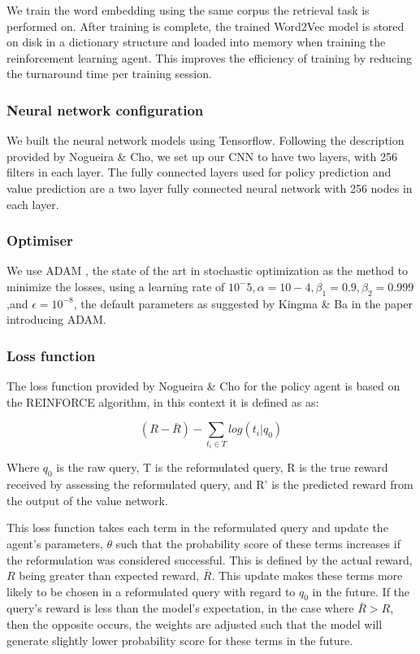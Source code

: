 We train the word embedding using the same corpus the retrieval task is performed on. After training is complete, the trained Word2Vec model is stored on disk in a dictionary structure and loaded into memory when training the reinforcement learning agent. This improves the efficiency of training by reducing the turnaround time per training session. 


\subsubsection{Neural network configuration}
We built the neural network models using Tensorflow. Following the description provided by Nogueira \& Cho\cite{nogueira2017task}, we set up our CNN to have two layers, with 256 filters in each layer. The fully connected layers used for policy prediction and value prediction are a two layer fully connected neural network with 256 nodes in each layer. 


\subsubsection{Optimiser}

We use ADAM \cite{kingma2014adam}, the state of the art in stochastic optimization as the method to minimize the losses, using a learning rate of $10^-5,\alpha=10−4,\beta_1 =0.9,\beta_2 =0.999$,and $\epsilon=10^{-8}$, the default parameters as suggested by Kingma \& Ba in the paper introducing ADAM.

\subsubsection{Loss function}

 The loss function provided by Nogueira \& Cho\cite{nogueira2017task} for the policy agent is based on the REINFORCE algorithm, in this context it is defined as as:

\begin{equation}
    (R - \bar{R}) - \sum_{t_i \in T} log (t_i|q_0) 
\end{equation}

Where $q_0$ is the raw query, T is the reformulated query, R is the true reward received by assessing the reformulated query, and R’ is the predicted reward from the output of the value network. 

This loss function takes each term in the reformulated query and update the agent's parameters, $\theta$ such that the probability score of these terms increases if the reformulation was considered successful. This is defined by the actual reward, $R$ being greater than expected reward, $\bar{R}$. This update makes these terms more likely to be chosen in a reformulated query with regard to $q_0$ in the future. If the query's reward is less than the model's expectation, in the case where $\bar{R} > R$, then the opposite occurs, the weights are adjusted such that the model will generate slightly lower probability score for these terms in the future.

